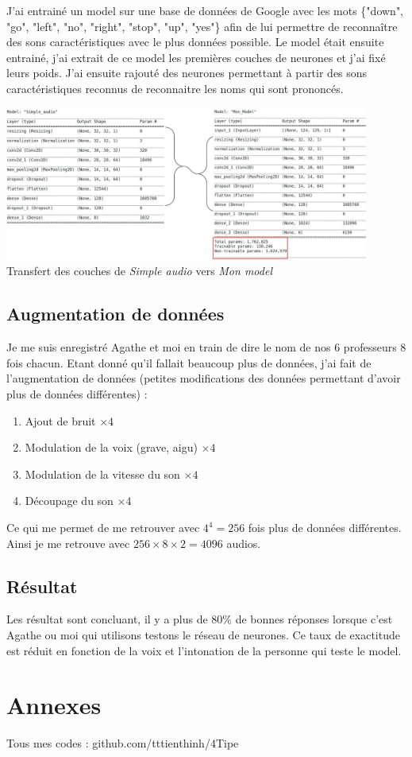 \documentclass[12pt,a4paper, french]{article}
\begin{document}
J'ai entrainé un model sur une base de données de Google avec les mots \{"down", "go", "left", "no", "right", "stop", "up", "yes"\} afin de lui permettre de reconnaître des sons caractéristiques avec le plus données possible. Le model était ensuite entrainé, j'ai extrait de ce model les premières couches de neurones et j'ai fixé leurs poids. J'ai ensuite rajouté des neurones permettant à partir des sons caractéristiques reconnus de reconnaitre les noms qui sont prononcés.
\begin{center}
    \includegraphics[width=12cm]{4-Transfert Learning.jpg} \\
    Transfert des couches de \textit{Simple audio} vers \textit{Mon model}
\end{center}

\subsection{Augmentation de données}
Je me suis enregistré Agathe et moi en train de dire le nom de nos 6 professeurs 8 fois chacun. Etant donné qu'il fallait beaucoup plus de données, j'ai fait de l'augmentation de données (petites modifications des données permettant d'avoir plus de données différentes) :  
\begin{enumerate}
	\item Ajout de bruit $\times 4$
	\item Modulation de la voix (grave, aigu) $\times 4$
	\item Modulation de la vitesse du son $\times 4$
	\item Découpage du son $\times 4$
\end{enumerate}
Ce qui me permet de me retrouver avec $4^4 = 256$ fois plus de données différentes. Ainsi je me retrouve avec $256 \times 8 \times 2 = 4096$ audios.

\subsection{Résultat}
Les résultat sont concluant, il y a plus de 80\% de bonnes réponses lorsque c'est Agathe ou moi qui utilisons testons le réseau de neurones. Ce taux de exactitude est réduit en fonction de la voix et l'intonation de la personne qui teste le model. 


\section*{Annexes}
Tous mes codes : github.com/tttienthinh/4Tipe
\end{document}
